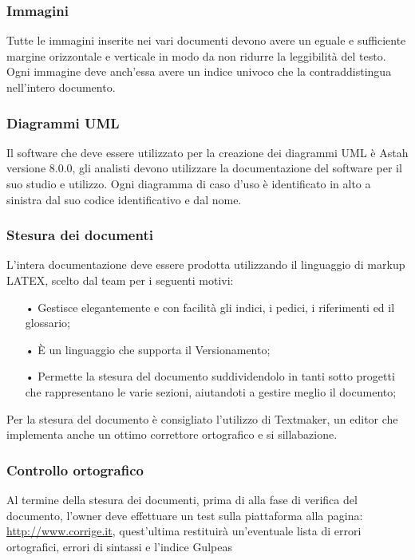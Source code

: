 \subsubsection{Immagini}
Tutte le immagini inserite nei vari documenti devono avere un eguale e sufficiente margine orizzontale e verticale in modo da non ridurre la leggibilità del testo. Ogni immagine deve anch’essa avere un indice univoco che la contraddistingua nell’intero documento.

\subsubsection{Diagrammi UML}
Il software che deve essere utilizzato per la creazione dei diagrammi UML è Astah versione 8.0.0, gli analisti devono utilizzare la documentazione del software per il suo studio e utilizzo.
Ogni diagramma di caso d’uso è identificato in alto a sinistra dal suo codice identificativo e dal nome.

\subsubsection{Stesura dei documenti}
L’intera documentazione deve essere prodotta utilizzando il linguaggio di markup LATEX, scelto dal team per i seguenti motivi:
\begin{itemize}
\item[•] Gestisce elegantemente e con facilità gli indici, i pedici, i riferimenti ed il glossario;
\item[•] È un linguaggio che supporta il Versionamento;
\item[•] Permette la stesura del documento suddividendolo in tanti sotto progetti che rappresentano le varie sezioni, aiutandoti a gestire meglio il documento;
\end{itemize}
Per la stesura del documento è consigliato l’utilizzo di Textmaker, un editor che implementa anche un ottimo correttore ortografico e si sillabazione.

\subsubsection{Controllo ortografico}
Al termine della stesura dei documenti, prima di alla fase di verifica del documento, l’owner deve effettuare un test sulla piattaforma alla pagina: \url{ http://www.corrige.it}, quest’ultima restituirà un’eventuale lista di errori ortografici, errori di sintassi e l’indice Gulpeas

